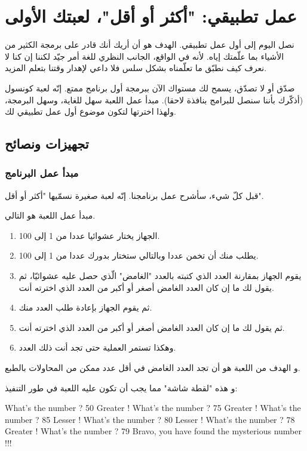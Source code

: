 \chapter{عمل تطبيقي: "أكثر أو أقل"، لعبتك الأولى}

نصل اليوم إلى أول عمل تطبيقي. الهدف هو أن أريك أنك قادر على برمجة الكثير من الأشياء بما علّمتك إياه. لأنه في الواقع، الجانب النظري للغة أمر جيّد لكننا إن كنا لا نعرف كيف نطبّق ما تعلّمناه بشكل سلس فلا داعي لإهدار وقتنا بتعلم المزيد.

صدّق أو لا تصدّق، يسمح لك مستواك الآن ببرمجة أول برنامج ممتع. إنّه لعبة كونسول (أذكّرك بأننا سنصل للبرامج بنافذة لاحقا). مبدأ عمل اللعبة سهل للغاية، وسهل البرمجة، ولهذا اخترتها لتكون موضوع أول عمل تطبيقي لك.

\section{تجهيزات ونصائح}

\subsection{مبدأ عمل البرنامج}

قبل كلّ شيء، سأشرح عمل برنامجنا. إنّه لعبة صغيرة نسمّيها "أكثر أو أقل".

مبدأ عمل اللعبة  هو التالي.

\begin{enumerate}
	\item الجهاز يختار عشوائيا عددا من 1 إلى 100.
	\item يطلب منك أن تخمن عددا وبالتالي ستختار بدورك عددا من 1 إلى 100.
	\item يقوم الجهاز بمقارنة العدد الذي كتبته بالعدد "الغامض" الّذي حصل عليه عشوائيّا، ثم يقول لك ما إن كان العدد الغامض أصغر أو أكبر من العدد الذي اخترته أنت.
	\item ثم يقوم الجهاز بإعادة طلب العدد منك.
	\item ثم يقول لك ما إن كان العدد الغامض أصغر أو أكبر من العدد الذي اخترته أنت.
	\item وهكذا تستمر العملية حتى تجد أنت ذلك العدد.
\end{enumerate}
و الهدف من اللعبة هو أن تجد العدد الغامض في أقل عدد ممكن من المحاولات بالطبع.

و هذه "لقطة شاشة" مما يجب أن تكون عليه اللعبة في طور التنفيذ:

\begin{Console}
What's the number ? 50
Greater !
What's the number ? 75
Greater  !
What's the number ? 85
Lesser !
What's the number ? 80
Lesser !
What's the number ? 78
Greater !
What's the number ? 79
Bravo, you have found the mysterious number !!!
\end{Console}

